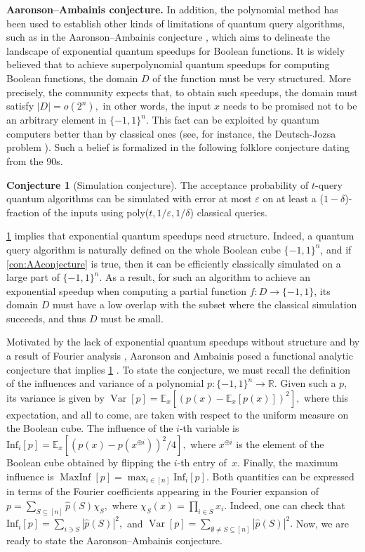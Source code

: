 \documentclass[11pt]{article}
\DeclareMathOperator{\var}{Var}
\DeclareMathOperator{\maxinf}{MaxInf}
\newcommand{\E}{\mathbb{E}}
\newcommand{\R}{\mathbb{R}} %
\newcommand{\1}{\mathbf{1}}
\newcommand\Inf{\mathrm{Inf}}
\newcommand{\eps}{\varepsilon}
\theoremstyle{plain}
\theoremstyle{definition}
\newtheorem{conjecture}[theorem]{Conjecture}
\theoremstyle{remark}
\begin{document}
\vspace{0.3cm}
\noindent\textbf{Aaronson--Ambainis conjecture.} In addition, the polynomial method has been used to establish other kinds of limitations of quantum query algorithms, such as in the Aaronson--Ambainis conjecture \cite{Aaronsons:2014}, which aims to delineate the landscape of exponential quantum speedups for Boolean functions. It is widely believed that to achieve superpolynomial quantum speedups for computing Boolean functions, the domain $D$ of the function must be very structured. More precisely, the community expects that, to obtain such speedups, the domain must satisfy $|D|=o(2^n),$ in other words,  the input $x$ needs to be promised not to be an arbitrary element in $\{-1,1\}^n$. This fact can be exploited by quantum computers better than by classical ones (see, for instance, the Deutsch-Jozsa problem \cite{deutsch1992rapid}). Such a belief is formalized in the following folklore conjecture dating from the 90s. 

\begin{conjecture}[Simulation conjecture]\label{con:needforstructure}
	The acceptance probability of $t$-query quantum algorithms can be simulated with error at most $\eps$ on at least a ($1-\delta$)-fraction of the inputs using poly($t,1/\eps,1/\delta$) classical queries.
\end{conjecture}

\cref{con:needforstructure} implies that exponential quantum speedups need structure. Indeed, a quantum query algorithm is naturally defined on the whole Boolean cube $\{-1,1\}^n$, and if \cref{con:AAconjecture} is true, then it can be efficiently classically simulated on a large part of $\{-1,1\}^n$. As a result, for such an algorithm to achieve an exponential speedup when computing a partial function $f:D\to \{-1,1\}$, its domain $D$ must have a low overlap with the subset where the classical simulation succeeds, and thus $D$ must be small. 

Motivated by the lack of exponential quantum speedups without structure and by a result of Fourier analysis \cite{dinur2006fourier}, Aaronson and Ambainis posed a functional analytic conjecture that implies \cref{con:needforstructure} \cite{Aaronsons:2014}. To state the conjecture, we must recall the definition of the influences and variance of a polynomial $p:\{-1,1\}^n\to \R.$ Given such a $p,$ its variance is given by $\var [p]=\E_{x}[(p(x)-\E_x[p(x)])^2],$ where this expectation, and all to come, are taken with respect to the uniform measure on the Boolean cube. The influence of the $i$-th variable is $\Inf_i[p]=\E_{x}[(p(x)-p(x^{\oplus i}))^2/4],$ where $x^{\oplus i}$ is the element of the Boolean cube obtained by flipping the $i$-th entry of~$x.$ Finally, the maximum influence is $\maxinf[p]=\max_{i\in [n]}\Inf_i[p].$ Both quantities can be expressed in terms of the Fourier coefficients appearing in the Fourier expansion of $p=\sum_{S\subseteq [n]}\widehat p(S)\chi_S,$ where $\chi_S(x)=\prod_{i\in S}x_i.$ Indeed, one can check that $\Inf_i[p]=\sum_{i\ni S}|\widehat p(S)|^2,$ and $\var[p]=\sum_{\emptyset \neq S\subseteq [n]}|\widehat p(S)|^2.$ Now, we are ready to state the Aaronson--Ambainis conjecture.
\end{document}

